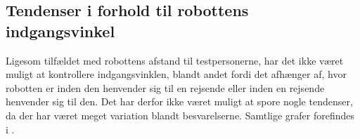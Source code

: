 \subsection{Tendenser i forhold til robottens indgangsvinkel}
\label{DatabehandlingIndgangsvinkelTendenser}
%
Ligesom tilfældet med robottens afstand til testpersonerne, har det ikke været muligt at kontrollere indgangsvinklen, blandt andet fordi det afhænger af, hvor robotten er inden den henvender sig til en rejsende eller inden en rejsende henvender sig til den. Det har derfor ikke været muligt at spore nogle tendenser, da der har været meget variation blandt besvarelserne. Samtlige grafer forefindes i . 
\newpage
